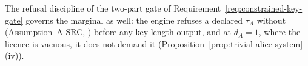 
\begin{requirement}\label{req:marginal-licence-gate}
The refusal discipline of the two-part gate of
Requirement~\ref{req:constrained-key-gate} governs the marginal as well: the engine refuses a declared $\tau_A$
without  (Assumption~A-SRC,
) before any key-length output, and at $d_A=1$,
where the licence is vacuous, it does not demand it
(Proposition~\ref{prop:trivial-alice-system}\,(iv)).
\end{requirement}
